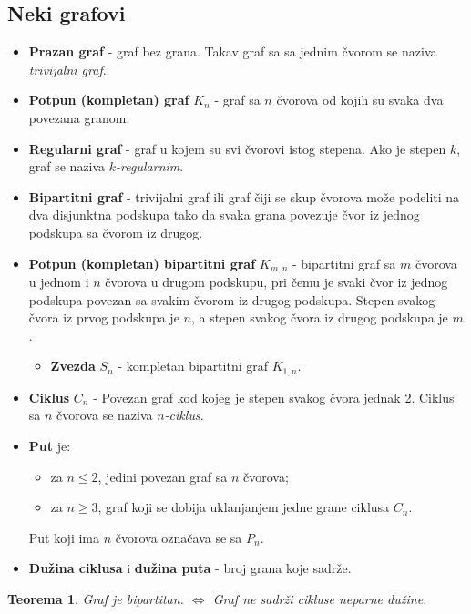 \documentclass[a4paper,12pt,twoside]{report}
\newtheorem{theorem}{Teorema}[section]
\numberwithin{algorithm}{section}
\begin{document}
\subsection{Neki grafovi}
\begin{itemize}
    \item \textbf{Prazan graf} - graf bez grana. Takav graf sa sa jednim čvorom se naziva \textit{trivijalni graf}.
    \item \textbf{Potpun (kompletan) graf} $K_n$ - graf sa $n$ čvorova od kojih su svaka dva povezana granom.
    \item \textbf{Regularni graf} - graf u kojem su svi čvorovi istog stepena. Ako je stepen $k$, graf se naziva \textit{$k$-regularnim}.
    \item \textbf{Bipartitni graf} - trivijalni graf ili graf čiji se skup čvorova može podeliti na dva disjunktna podskupa tako da svaka grana povezuje čvor iz jednog podskupa sa čvorom iz drugog.
    \item \textbf{Potpun (kompletan) bipartitni graf} $K_{m, n}$ - bipartitni graf sa $m$ čvorova u jednom i $n$ čvorova u drugom podskupu, pri čemu je svaki čvor iz jednog podskupa povezan sa svakim čvorom iz drugog podskupa. Stepen svakog čvora iz prvog podskupa je $n$, a stepen svakog čvora iz drugog podskupa je $m$.
    \begin{itemize}
        \item \textbf{Zvezda} $S_n$ - kompletan bipartitni graf $K_{1, n}$.
    \end{itemize}
    \item \textbf{Ciklus} $C_n$ - Povezan graf kod kojeg je stepen svakog čvora jednak 2. Ciklus sa $n$ čvorova se naziva \textit{$n$-ciklus}.
    \item \textbf{Put} je:
    \begin{itemize}
        \item za $n \leq 2$, jedini povezan graf sa $n$ čvorova;
        \item za $n \geq 3$, graf koji se dobija uklanjanjem jedne grane ciklusa $C_n$.
    \end{itemize} Put koji ima $n$ čvorova označava se sa $P_n$.
    \item  \textbf{Dužina ciklusa} i \textbf{dužina puta} - broj grana koje sadrže.
\end{itemize}
\begin{theorem}
    Graf je bipartitan. $\iff$ Graf ne sadrži cikluse neparne dužine.
\end{theorem}
\end{document}

